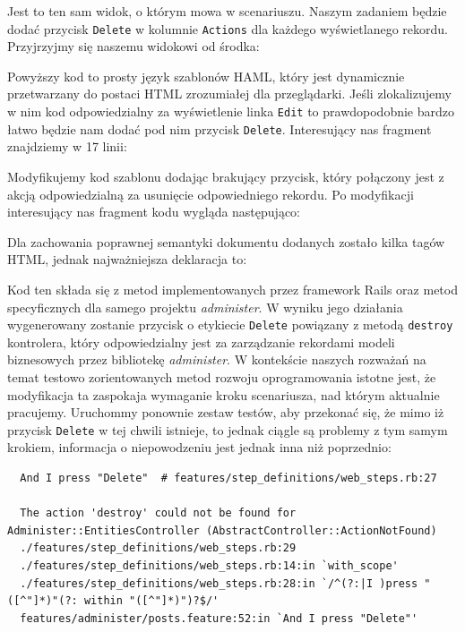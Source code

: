   Jest to ten sam widok, o którym mowa w scenariuszu. Naszym zadaniem będzie dodać przycisk \verb+Delete+ w kolumnie \verb+Actions+ dla każdego wyświetlanego rekordu. Przyjrzyjmy się naszemu widokowi od środka:
  
  
  
  Powyższy kod to prosty język szablonów HAML, który jest dynamicznie przetwarzany do postaci HTML zrozumiałej dla przeglądarki. Jeśli zlokalizujemy w nim kod odpowiedzialny za wyświetlenie linka \texttt{Edit} to prawdopodobnie bardzo łatwo będzie nam dodać pod nim przycisk \texttt{Delete}. Interesujący nas fragment znajdziemy w 17 linii:
  
  
  
  Modyfikujemy kod szablonu dodając brakujący przycisk, który połączony jest z akcją odpowiedzialną za usunięcie odpowiedniego rekordu. Po modyfikacji interesujący nas fragment kodu wygląda następująco:
  
  
  
  Dla zachowania poprawnej semantyki dokumentu dodanych zostało kilka tagów HTML, jednak najważniejsza deklaracja to:
  
  
  
  Kod ten składa się z metod implementowanych przez framework Rails oraz metod specyficznych dla samego projektu \emph{administer}. W wyniku jego działania wygenerowany zostanie przycisk o etykiecie \texttt{Delete} powiązany z metodą \texttt{destroy} kontrolera, który odpowiedzialny jest za zarządzanie rekordami modeli biznesowych przez bibliotekę \emph{administer}. W kontekście naszych rozważań na temat testowo zorientowanych metod rozwoju oprogramowania istotne jest, że modyfikacja ta zaspokaja wymaganie kroku scenariusza, nad którym aktualnie pracujemy. Uruchommy ponownie zestaw testów, aby przekonać się, że mimo iż przycisk \texttt{Delete} w tej chwili istnieje, to jednak ciągle są problemy z tym samym krokiem, informacja o niepowodzeniu jest jednak inna niż poprzednio:
  
  \begin{lstlisting}
  And I press "Delete"  # features/step_definitions/web_steps.rb:27
  
  The action 'destroy' could not be found for Administer::EntitiesController (AbstractController::ActionNotFound)
  ./features/step_definitions/web_steps.rb:29
  ./features/step_definitions/web_steps.rb:14:in `with_scope'
  ./features/step_definitions/web_steps.rb:28:in `/^(?:|I )press "([^"]*)"(?: within "([^"]*)")?$/'
  features/administer/posts.feature:52:in `And I press "Delete"'
  \end{lstlisting}
  
